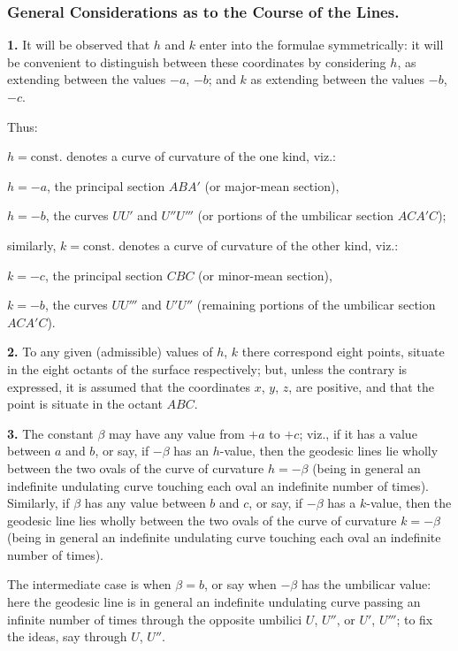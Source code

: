 \documentclass[11pt,a4paper]{article}
\begin{document}
\subsubsection*{General Considerations as to the Course of the Lines.}

\noindent\textbf{1.} It will be observed that $h$ and $k$ enter into the formulae symmetrically: it will be convenient to distinguish between these coordinates by considering $h$, as extending between the values $-a$, $-b$; and $k$ as extending between the values $-b$, $-c$.

Thus:

$h = \text{const.}$ denotes a curve of curvature of the one kind, viz.:

$h = -a$, the principal section $ABA'$ (or major-mean section),

$h = -b$, the curves $UU'$ and $U''U'''$ (or portions of the umbilicar section $ACA'C$);

similarly, $k = \text{const.}$ denotes a curve of curvature of the other kind, viz.:

$k = -c$, the principal section $CBC$ (or minor-mean section),

$k = -b$, the curves $UU'''$ and $U'U''$ (remaining portions of the umbilicar section $ACA'C$).

\noindent\textbf{2.} To any given (admissible) values of $h$, $k$ there correspond eight points, situate in the eight octants of the surface respectively; but, unless the contrary is expressed, it is assumed that the coordinates $x$, $y$, $z$, are positive, and that the point is situate in the octant $ABC$.

\noindent\textbf{3.} The constant $\beta$ may have any value from $+a$ to $+c$; viz., if it has a value between $a$ and $b$, or say, if $-\beta$ has an $h$-value, then the geodesic lines lie wholly between the two ovals of the curve of curvature $h = -\beta$ (being in general an indefinite undulating curve touching each oval an indefinite number of times). Similarly, if $\beta$ has any value between $b$ and $c$, or say, if $-\beta$ has a $k$-value, then the geodesic line lies wholly between the two ovals of the curve of curvature $k = -\beta$ (being in general an indefinite undulating curve touching each oval an indefinite number of times).

The intermediate case is when $\beta = b$, or say when $-\beta$ has the umbilicar value: here the geodesic line is in general an indefinite undulating curve passing an infinite number of times through the opposite umbilici $U$, $U''$, or $U'$, $U'''$; to fix the ideas, say through $U$, $U''$.
\end{document}
